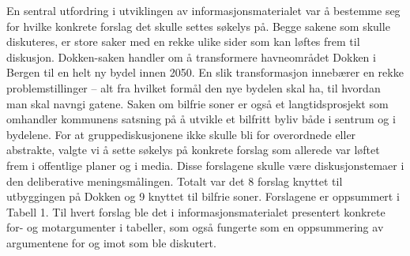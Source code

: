 \documentclass[
  12pt,
  a4paper, 12pt]{article}
\begin{document}
En sentral utfordring i utviklingen av informasjonsmaterialet var å bestemme seg for hvilke konkrete forslag det skulle settes søkelys på. Begge sakene som skulle diskuteres, er store saker med en rekke ulike sider som kan løftes frem til diskusjon. Dokken-saken handler om å transformere havneområdet Dokken i Bergen til en helt ny bydel innen 2050. En slik transformasjon innebærer en rekke problemstillinger -- alt fra hvilket formål den nye bydelen skal ha, til hvordan man skal navngi gatene. Saken om bilfrie soner er også et langtidsprosjekt som omhandler kommunens satsning på å utvikle et bilfritt byliv både i sentrum og i bydelene. For at gruppediskusjonene ikke skulle bli for overordnede eller abstrakte, valgte vi å sette søkelys på konkrete forslag som allerede var løftet frem i offentlige planer og i media. Disse forslagene skulle være diskusjonstemaer i den deliberative meningsmålingen. Totalt var det 8 forslag knyttet til utbyggingen på Dokken og 9 knyttet til bilfrie soner. Forslagene er oppsummert i Tabell 1. Til hvert forslag ble det i informasjonsmaterialet presentert konkrete for- og motargumenter i tabeller, som også fungerte som en oppsummering av argumentene for og imot som ble diskutert.
\end{document}
